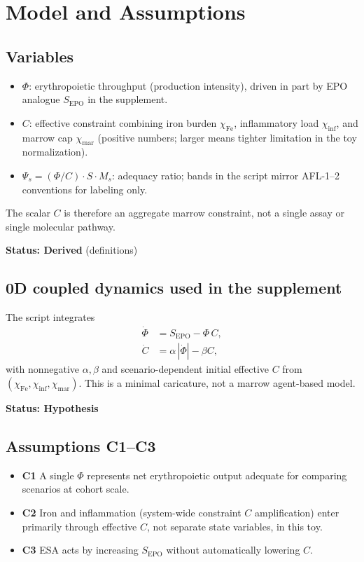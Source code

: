 \documentclass[11pt]{article}
\begin{document}
\section{Model and Assumptions}

\subsection{Variables}
\begin{itemize}
  \item $\Phi$: erythropoietic throughput (production intensity), driven in part by EPO analogue $S_{\mathrm{EPO}}$ in the supplement.
  \item $C$: effective constraint combining iron burden $\chi_{\mathrm{Fe}}$, inflammatory load $\chi_{\mathrm{inf}}$, and marrow cap $\chi_{\mathrm{mar}}$ (positive numbers; larger means tighter limitation in the toy normalization).
  \item $\Psi_s=(\Phi/C) \cdot S \cdot M_s$: adequacy ratio; bands in the script mirror AFL-1--2 conventions for labeling only.
\end{itemize}
The scalar $C$ is therefore an aggregate marrow constraint, not a single assay or
single molecular pathway.

\textbf{Status: Derived} (definitions)

\subsection{0D coupled dynamics used in the supplement}
The script integrates
\begin{align}
  \dot{\Phi} &= S_{\mathrm{EPO}} - \Phi\, C, \\
  \dot{C} &= \alpha\,|\dot{\Phi}| - \beta C,
\end{align}
with nonnegative $\alpha,\beta$ and scenario-dependent initial effective $C$ from $(\chi_{\mathrm{Fe}},\chi_{\mathrm{inf}},\chi_{\mathrm{mar}})$. This is a minimal caricature, not a marrow agent-based model.

\textbf{Status: Hypothesis}

\subsection{Assumptions C1--C3}
\begin{itemize}
  \item \textbf{C1} A single $\Phi$ represents net erythropoietic output adequate for comparing scenarios at cohort scale.
  \item \textbf{C2} Iron and inflammation (system-wide constraint $C$ amplification) enter primarily through effective $C$, not separate state variables, in this toy.
  \item \textbf{C3} ESA acts by increasing $S_{\mathrm{EPO}}$ without automatically lowering $C$.
\end{itemize}
\end{document}
